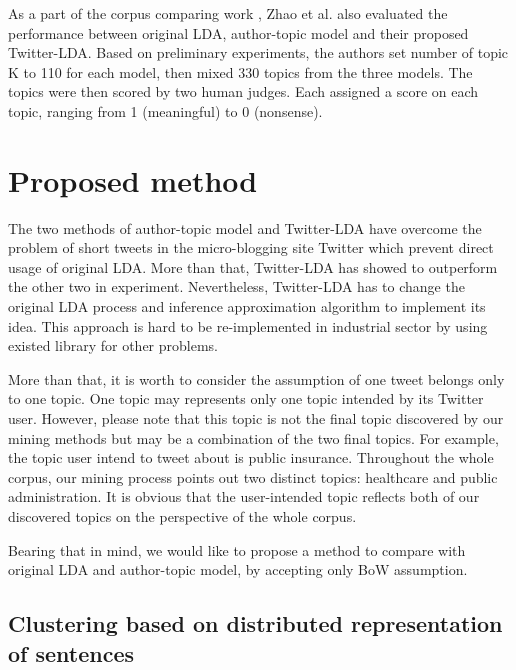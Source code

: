 \documentclass[conference,compsoc]{IEEEtran}
\begin{document}
As a part of the corpus comparing work \cite{zhao2011comparing}, Zhao et al. also evaluated the performance between original LDA, author-topic model and their proposed Twitter-LDA. Based on preliminary experiments, the authors set number of topic K to 110 for each model, then mixed 330 topics from the three models. The topics were then scored by two human judges. Each assigned a score on each topic, ranging from 1 (meaningful) to 0 (nonsense).



\section{Proposed method} \label{proposal}

The two methods of author-topic model and Twitter-LDA have overcome the problem of short tweets in the micro-blogging site Twitter which prevent direct usage of original LDA. More than that, Twitter-LDA has showed to outperform the other two in experiment. Nevertheless, Twitter-LDA has to change the original LDA process and inference approximation algorithm to implement its idea. This approach is hard to be re-implemented in industrial sector by using existed library for other problems.

More than that, it is worth to consider the assumption of one tweet belongs only to one topic. One topic may represents only one topic intended by its Twitter user. However, please note that this topic is not the final topic discovered by our mining methods but may be a combination of the two final topics. For example, the topic user intend to tweet about is public insurance. Throughout the whole corpus, our mining process points out two distinct topics: healthcare and public administration. It is obvious that the user-intended topic reflects both of our discovered topics on the perspective of the whole corpus.

Bearing that in mind, we would like to propose a method to compare with original LDA and author-topic model, by accepting only BoW assumption.

\subsection{Clustering based on distributed representation of sentences} \label{doc2vec}
\end{document}
